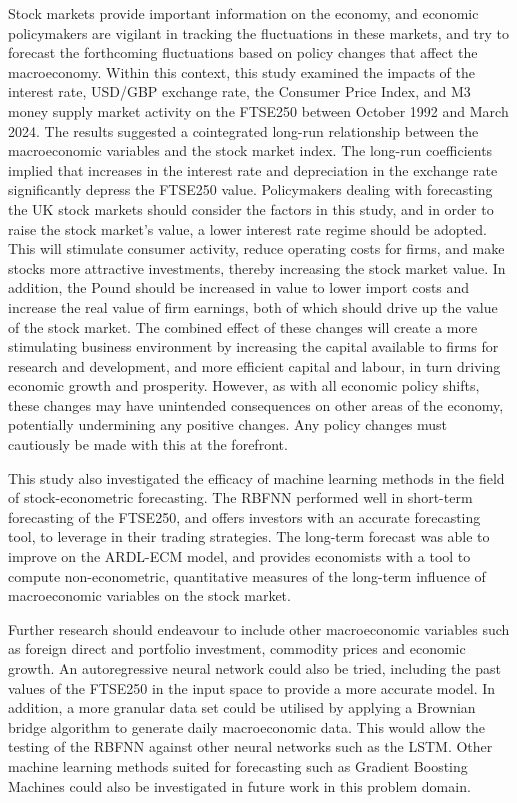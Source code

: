 \documentclass[11pt,a4paper]{article}
\begin{document}
Stock markets provide important information on the economy, 
and economic policymakers are vigilant in tracking the fluctuations 
in these markets, and try to forecast the 
forthcoming fluctuations based on policy changes that affect the macroeconomy.
Within this context, this study examined the 
impacts of the interest rate, USD/GBP
exchange rate, the Consumer Price Index, and 
M3 money supply market activity on
the FTSE250 between October 1992 and March 2024.
The results suggested a cointegrated long-run
relationship between the macroeconomic variables and the stock market index. 
The long-run coefficients implied that
increases in the interest rate and depreciation in the exchange rate
significantly depress the FTSE250 value. 
Policymakers dealing with forecasting the UK stock markets
should consider the factors in this study, and in order to raise the stock
market's value, a lower interest rate regime should be adopted. This will 
stimulate consumer activity, reduce operating costs for firms, and make 
stocks more attractive investments, thereby increasing the stock market value. 
In addition, the Pound should be increased in value to lower import costs 
and increase the real value of firm earnings, both of which should drive up 
the value of the stock market. The combined effect of these changes will 
create a more stimulating business environment by increasing the capital 
available to firms for research and development, and more efficient 
capital and labour, in turn 
driving economic growth and prosperity. However, 
as with all economic policy shifts, these changes may have 
unintended consequences on other areas of the economy, potentially 
undermining any positive changes. Any policy changes must cautiously be made 
with this at the forefront.


This study also investigated the efficacy of machine learning methods in 
the field of stock-econometric forecasting. The RBFNN performed well in
short-term forecasting of the FTSE250, and offers investors with an accurate forecasting tool, 
to leverage in their trading strategies. The long-term forecast was able to improve on the ARDL-ECM model, and provides 
economists with a tool to compute non-econometric, quantitative measures of the 
long-term influence of macroeconomic variables on the stock market. 

Further research should endeavour to include other macroeconomic variables such as 
foreign direct and portfolio investment, commodity prices and economic growth.
An autoregressive neural network could also be tried, including the past values of the 
FTSE250 in the input space to provide a more accurate model. In addition, 
a more granular data set could be utilised by applying a 
Brownian bridge algorithm to generate daily macroeconomic data. This would allow 
the testing of the RBFNN against other neural networks 
such as the LSTM. Other machine learning methods suited for 
forecasting such as Gradient Boosting Machines could 
also be investigated in future work in this problem domain. 
\end{document}
